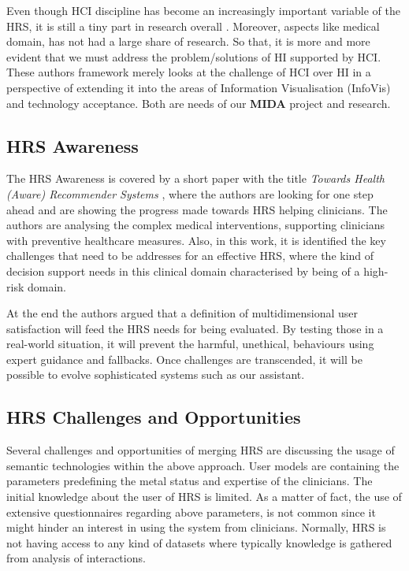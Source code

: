 Even though HCI discipline has become an increasingly important variable of the HRS, it is still a tiny part in research overall \cite{calero2016hci}. Moreover, aspects like medical domain, has not had a large share of research. So that, it is more and more evident that we must address the problem/solutions of HI supported by HCI. These authors framework merely looks at the challenge of HCI over HI in a perspective of extending it into the areas of Information Visualisation (InfoVis) and technology acceptance. Both are needs of our \textbf{MIDA} project and research.

\subsection{HRS Awareness}

The HRS Awareness is covered by a short paper with the title \textit{Towards Health (Aware) Recommender Systems} \cite{schafer2017towards}, where the authors are looking for one step ahead and are showing the progress made towards HRS helping clinicians. The authors are analysing the complex medical interventions, supporting clinicians with preventive healthcare measures. Also, in this work, it is identified the key challenges that need to be addresses for an effective HRS, where the kind of decision support needs in this clinical domain characterised by being of a high-risk domain.

At the end the authors argued that a definition of multidimensional user satisfaction will feed the HRS needs for being evaluated. By testing those in a real-world situation, it will prevent the harmful, unethical, behaviours using expert guidance and fallbacks. Once challenges are transcended, it will be possible to evolve sophisticated systems such as our assistant.

\subsection{HRS Challenges and Opportunities}

Several challenges and opportunities of merging HRS are discussing \cite{fernandez2009challenges} the usage of semantic technologies within the above approach. User models are containing the parameters predefining the metal status and expertise of the clinicians. The initial knowledge about the user of HRS is limited. As a matter of fact, the use of extensive questionnaires regarding above parameters, is not common since it might hinder an interest in using the system from clinicians. Normally, HRS is not having access to any kind of datasets where typically knowledge is gathered from analysis of interactions.

